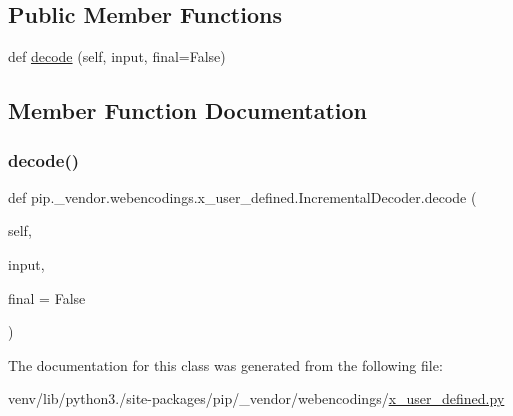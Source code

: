 \subsection*{Public Member Functions}
\begin{DoxyCompactItemize}
\item 
def \hyperlink{classpip_1_1__vendor_1_1webencodings_1_1x__user__defined_1_1IncrementalDecoder_a161abee4fa55963070b158734329dd5d}{decode} (self, input, final=False)
\end{DoxyCompactItemize}


\subsection{Member Function Documentation}
\mbox{\label{classpip_1_1__vendor_1_1webencodings_1_1x__user__defined_1_1IncrementalDecoder_a161abee4fa55963070b158734329dd5d}} 
\subsubsection{\texorpdfstring{decode()}{decode()}}
{\footnotesize\ttfamily def pip.\+\_\+vendor.\+webencodings.\+x\+\_\+user\+\_\+defined.\+Incremental\+Decoder.\+decode (\begin{DoxyParamCaption}\item[{}]{self,  }\item[{}]{input,  }\item[{}]{final = {\ttfamily False} }\end{DoxyParamCaption})}



The documentation for this class was generated from the following file\+:\begin{DoxyCompactItemize}
\item 
venv/lib/python3./site-\/packages/pip/\+\_\+vendor/webencodings/\hyperlink{x__user__defined_8py}{x\+\_\+user\+\_\+defined.\+py}\end{DoxyCompactItemize}
